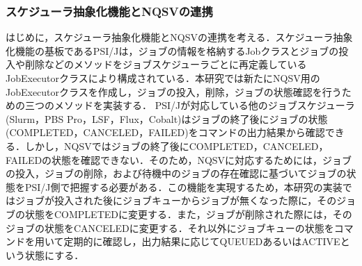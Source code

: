 \subsubsection{スケジューラ抽象化機能とNQSVの連携}
はじめに，スケジューラ抽象化機能とNQSVの連携を考える．スケジューラ抽象化機能の基板であるPSI/Jは，ジョブの情報を格納するJobクラスとジョブの投入や削除などのメソッドをジョブスケジューラごとに再定義しているJobExecutorクラスにより構成されている．本研究では新たにNQSV用のJobExecutorクラスを作成し，ジョブの投入，削除，ジョブの状態確認を行うための三つのメソッドを実装する．
PSI/Jが対応している他のジョブスケジューラ(Slurm，PBS Pro，LSF，Flux，Cobalt)はジョブの終了後にジョブの状態(COMPLETED，CANCELED，FAILED)をコマンドの出力結果から確認できる．しかし，NQSVではジョブの終了後にCOMPLETED，CANCELED，FAILEDの状態を確認できない．そのため，NQSVに対応するためには，ジョブの投入，ジョブの削除，および待機中のジョブの存在確認に基づいてジョブの状態をPSI/J側で把握する必要がある．この機能を実現するため，本研究の実装ではジョブが投入された後にジョブキューからジョブが無くなった際に，そのジョブの状態をCOMPLETEDに変更する．また，ジョブが削除された際には，そのジョブの状態をCANCELEDに変更する．それ以外にジョブキューの状態をコマンドを用いて定期的に確認し，出力結果に応じてQUEUEDあるいはACTIVEという状態にする．\par
